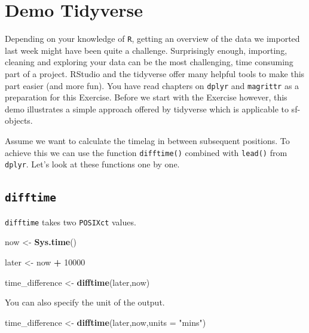 \documentclass[]{book}
\newenvironment{Shaded}{\begin{snugshade}}{\end{snugshade}}
\newcommand{\KeywordTok}[1]{\textcolor[rgb]{0.13,0.29,0.53}{\textbf{#1}}}
\newcommand{\DataTypeTok}[1]{\textcolor[rgb]{0.13,0.29,0.53}{#1}}
\newcommand{\DecValTok}[1]{\textcolor[rgb]{0.00,0.00,0.81}{#1}}
\newcommand{\StringTok}[1]{\textcolor[rgb]{0.31,0.60,0.02}{#1}}
\newcommand{\OperatorTok}[1]{\textcolor[rgb]{0.81,0.36,0.00}{\textbf{#1}}}
\newcommand{\NormalTok}[1]{#1}
\begin{document}
\section{Demo Tidyverse}\label{demo-tidyverse}

Depending on your knowledge of \texttt{R}, getting an overview of the
data we imported last week might have been quite a challenge.
Surprisingly enough, importing, cleaning and exploring your data can be
the most challenging, time consuming part of a project. RStudio and the
tidyverse offer many helpful tools to make this part easier (and more
fun). You have read chapters on \texttt{dplyr} and \texttt{magrittr} as
a preparation for this Exercise. Before we start with the Exercise
however, this demo illustrates a simple approach offered by tidyverse
which is applicable to sf-objects.

Assume we want to calculate the timelag in between subsequent positions.
To achieve this we can use the function \texttt{difftime()} combined
with \texttt{lead()} from \texttt{dplyr}. Let's look at these functions
one by one.

\subsection{\texorpdfstring{\texttt{difftime}}{difftime}}\label{difftime}

\texttt{difftime} takes two \texttt{POSIXct} values.

\begin{Shaded}
\begin{Highlighting}[]
\NormalTok{now <-}\StringTok{ }\KeywordTok{Sys.time}\NormalTok{()}

\NormalTok{later <-}\StringTok{ }\NormalTok{now }\OperatorTok{+}\StringTok{ }\DecValTok{10000}

\NormalTok{time_difference <-}\StringTok{ }\KeywordTok{difftime}\NormalTok{(later,now)}
\end{Highlighting}
\end{Shaded}

You can also specify the unit of the output.

\begin{Shaded}
\begin{Highlighting}[]
\NormalTok{time_difference <-}\StringTok{ }\KeywordTok{difftime}\NormalTok{(later,now,}\DataTypeTok{units =} \StringTok{"mins"}\NormalTok{)}
\end{Highlighting}
\end{Shaded}
\end{document}
